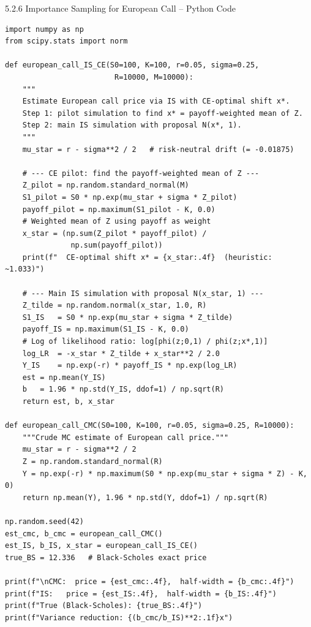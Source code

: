 \documentclass[aspectratio=169,10pt]{beamer}
\begin{document}
\begin{frame}[fragile]{5.2.6 Importance Sampling for European Call -- Python Code}
\begin{lstlisting}[style=python]
import numpy as np
from scipy.stats import norm

def european_call_IS_CE(S0=100, K=100, r=0.05, sigma=0.25,
                         R=10000, M=10000):
    """
    Estimate European call price via IS with CE-optimal shift x*.
    Step 1: pilot simulation to find x* = payoff-weighted mean of Z.
    Step 2: main IS simulation with proposal N(x*, 1).
    """
    mu_star = r - sigma**2 / 2   # risk-neutral drift (= -0.01875)

    # --- CE pilot: find the payoff-weighted mean of Z ---
    Z_pilot = np.random.standard_normal(M)
    S1_pilot = S0 * np.exp(mu_star + sigma * Z_pilot)
    payoff_pilot = np.maximum(S1_pilot - K, 0.0)
    # Weighted mean of Z using payoff as weight
    x_star = (np.sum(Z_pilot * payoff_pilot) /
               np.sum(payoff_pilot))
    print(f"  CE-optimal shift x* = {x_star:.4f}  (heuristic: ~1.033)")

    # --- Main IS simulation with proposal N(x_star, 1) ---
    Z_tilde = np.random.normal(x_star, 1.0, R)
    S1_IS   = S0 * np.exp(mu_star + sigma * Z_tilde)
    payoff_IS = np.maximum(S1_IS - K, 0.0)
    # Log of likelihood ratio: log[phi(z;0,1) / phi(z;x*,1)]
    log_LR  = -x_star * Z_tilde + x_star**2 / 2.0
    Y_IS    = np.exp(-r) * payoff_IS * np.exp(log_LR)
    est = np.mean(Y_IS)
    b   = 1.96 * np.std(Y_IS, ddof=1) / np.sqrt(R)
    return est, b, x_star

def european_call_CMC(S0=100, K=100, r=0.05, sigma=0.25, R=10000):
    """Crude MC estimate of European call price."""
    mu_star = r - sigma**2 / 2
    Z = np.random.standard_normal(R)
    Y = np.exp(-r) * np.maximum(S0 * np.exp(mu_star + sigma * Z) - K, 0)
    return np.mean(Y), 1.96 * np.std(Y, ddof=1) / np.sqrt(R)

np.random.seed(42)
est_cmc, b_cmc = european_call_CMC()
est_IS, b_IS, x_star = european_call_IS_CE()
true_BS = 12.336   # Black-Scholes exact price

print(f"\nCMC:  price = {est_cmc:.4f},  half-width = {b_cmc:.4f}")
print(f"IS:   price = {est_IS:.4f},  half-width = {b_IS:.4f}")
print(f"True (Black-Scholes): {true_BS:.4f}")
print(f"Variance reduction: {(b_cmc/b_IS)**2:.1f}x")
\end{lstlisting}
\end{frame}
\end{document}
